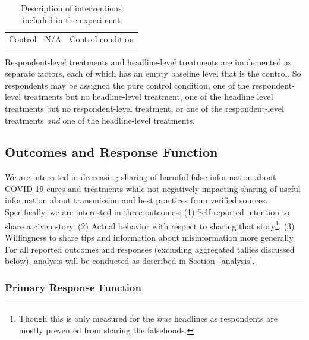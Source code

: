 \documentclass[letterpaper, 12pt, parskip=full,]{scrartcl}
\begin{document}
\begin{table}[H]
\begin{tabular}{l|l|l}
 \\
Control                                                                                                        & N/A                                                                                                          & Control condition                                                                                                                                                                                                                                                                                                                                                                                              
\end{tabular}
\caption{Description of interventions included in the experiment}
\label{tab:treatments}
\end{table}

Respondent-level treatments and headline-level treatments are implemented as separate factors, each of which has an empty baseline level that is the control. So respondents may be assigned the pure control condition, one of the respondent-level treatments but no headline-level treatment, one of the headline level treatments but no respondent-level treatment, or one of the respondent-level treatments \textit{and} one of the headline-level treatments. 


\subsection{Outcomes and Response Function}

We are interested in decreasing sharing of harmful false information about COVID-19 cures and treatments while not negatively impacting sharing of useful information about transmission and best practices from verified sources. Specifically, we are interested in three outcomes: (1) Self-reported intention to share a given story, (2) Actual behavior with respect to sharing that story\footnote{Though this is only measured for the \textit{true} headlines as respondents are mostly prevented from sharing the falsehoods.}, (3) Willingness to share tips and information about misinformation more generally. For all reported outcomes and responses (excluding aggregated tallies discussed below), analysis will be conducted as described in Section~\ref{analysis}.  

\subsubsection{Primary Response Function}
\end{document}

